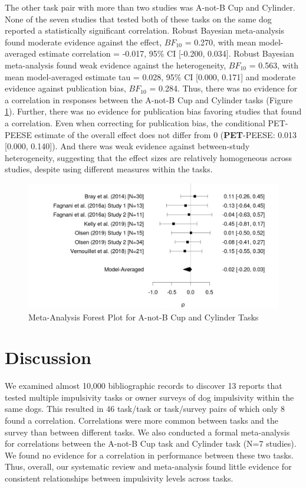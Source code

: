 \documentclass[
  ,pub,floatsintext]{apa6}
\begin{document}
The other task pair with more than two studies was A-not-B Cup and Cylinder. None of the seven studies that tested both of these tasks on the same dog reported a statistically significant correlation. Robust Bayesian meta-analysis found moderate evidence against the effect, \(BF_{10}\) = 0.270, with mean model-averaged estimate correlation = -0.017, 95\% CI {[}-0.200, 0.034{]}. Robust Bayesian meta-analysis found weak evidence against the heterogeneity, \(BF_{10}\) = 0.563, with mean model-averaged estimate tau = 0.028, 95\% CI {[}0.000, 0.171{]} and moderate evidence against publication bias, \(BF_{10}\) = 0.284. Thus, there was no evidence for a correlation in responses between the A-not-B Cup and Cylinder tasks (Figure \ref{fig:forest}). Further, there was no evidence for publication bias favoring studies that found a correlation. Even when correcting for publication bias, the conditional PET-PEESE estimate of the overall effect does not differ from 0 (\textbf{PET}-PEESE: 0.013 {[}0.000, 0.140{]}). And there was weak evidence against between-study heterogeneity, suggesting that the effect sizes are relatively homogeneous across studies, despite using different measures within the tasks.

\begin{figure}
\caption{\newline Meta-Analysis Forest Plot for A-not-B Cup and Cylinder Tasks \label{fig:forest}}
\begin{center}
\includegraphics[width=0.8\linewidth]{"figures/anotb-cylinder-forestplot.png"}
\end{center}


\end{figure}

\hypertarget{discussion}{%
\section{Discussion}\label{discussion}}

We examined almost 10,000 bibliographic records to discover 13 reports that tested multiple impulsivity tasks or owner surveys of dog impulsivity within the same dogs. This resulted in 46 task/task or task/survey pairs of which only 8 found a correlation. Correlations were more common between tasks and the survey than between different tasks. We also conducted a formal meta-analysis for correlations between the A-not-B Cup task and Cylinder task (N=7 studies). We found no evidence for a correlation in performance between these two tasks. Thus, overall, our systematic review and meta-analysis found little evidence for consistent relationships between impulsivity levels across tasks.
\end{document}
